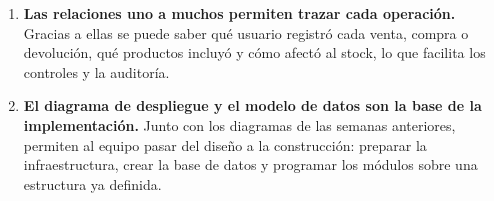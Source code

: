 \documentclass[12pt,a4paper]{article}
\begin{document}
\begin{enumerate}
  \item \textbf{Las relaciones uno a muchos permiten trazar cada operación.} Gracias a ellas se puede saber qué usuario registró cada venta, compra o devolución, qué productos incluyó y cómo afectó al stock, lo que facilita los controles y la auditoría.
  \item \textbf{El diagrama de despliegue y el modelo de datos son la base de la implementación.} Junto con los diagramas de las semanas anteriores, permiten al equipo pasar del diseño a la construcción: preparar la infraestructura, crear la base de datos y programar los módulos sobre una estructura ya definida.
\end{enumerate}

%
%
%
\end{document}
